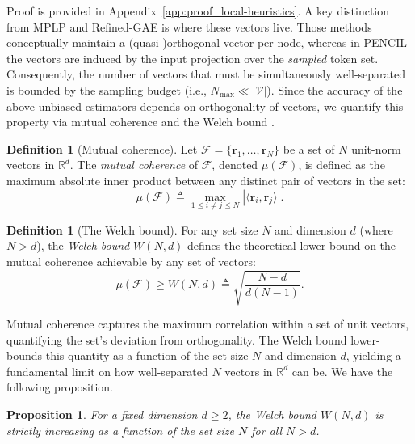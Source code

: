 \documentclass{article}
\theoremstyle{plain}
\newtheorem{proposition}[theorem]{Proposition}
\theoremstyle{definition}
\newtheorem{definition}[theorem]{Definition}
\theoremstyle{remark}
\begin{document}
Proof is provided in Appendix~\ref{app:proof_local-heuristics}. A key distinction from MPLP \cite{dong_pure_2024} and Refined-GAE \cite{ma_reconsidering_2025} is where these vectors live. Those methods conceptually maintain a (quasi-)orthogonal vector per node, whereas in PENCIL the vectors are induced by the input projection over the \emph{sampled} token set. Consequently, the number of vectors that must be simultaneously well-separated is bounded by the sampling budget (i.e., \(N_{\max} \ll |\mathcal V|\)). Since the accuracy of the above unbiased estimators depends on orthogonality of vectors, we quantify this property via mutual coherence
\cite{donoho_uncertainty_2001} and the Welch bound \cite{welch_lower_1974}.

\begin{definition}[Mutual coherence]
    Let $\mathcal{F} = \{\mathbf{r}_1, \dots, \mathbf{r}_N\}$ be a set of $N$ unit-norm vectors in $\mathbb{R}^d$. The \textit{mutual coherence} of $\mathcal{F}$, denoted $\mu(\mathcal{F})$, is defined as the maximum absolute inner product between any distinct pair of vectors in the set:
    \begin{equation}
        \mu(\mathcal{F}) \triangleq \max_{1 \leq i \neq j \leq N} |\langle \mathbf{r}_i, \mathbf{r}_j \rangle|.
    \end{equation}
\end{definition}

\begin{definition}[The Welch bound]
For any set size $N$ and dimension $d$ (where $N > d$), the \textit{Welch bound} $W(N, d)$ defines the theoretical lower bound on the mutual coherence achievable by any set of vectors:
\begin{equation}
    \mu(\mathcal{F}) \geq W(N, d) \triangleq \sqrt{\frac{N-d}{d(N-1)}}.
\end{equation}
\end{definition}

Mutual coherence captures the maximum correlation within a set of unit vectors, quantifying the set's deviation from orthogonality. The Welch bound lower-bounds this quantity as a function of the set size \(N\) and dimension \(d\), yielding a
fundamental limit on how well-separated \(N\) vectors in \(\mathbb{R}^d\) can be. We have the following proposition.

\begin{proposition} \label{prop:monotonicity-of-welch-bound}
    For a fixed dimension $d \ge 2$, the Welch bound $W(N,d)$ is strictly increasing as a function of the set size $N$ for all $N > d$.
\end{proposition}
\end{document}
